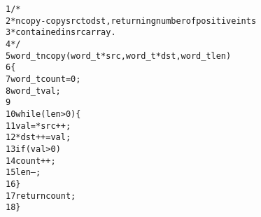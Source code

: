 \begin{alltt}
{\scriptsize   1} /*
{\scriptsize   2}  * ncopy - copy src to dst, returning number of positive ints
{\scriptsize   3}  * contained in src array.
{\scriptsize   4}  */
{\scriptsize   5} word_t ncopy(word_t *src, word_t *dst, word_t len)
{\scriptsize   6} \verb:{:
{\scriptsize   7}     word_t count = 0;
{\scriptsize   8}     word_t val;
{\scriptsize   9} 
{\scriptsize  10}     while (len > 0) \verb:{:
{\scriptsize  11}         val = *src++;
{\scriptsize  12}         *dst++ = val;
{\scriptsize  13}         if (val > 0)
{\scriptsize  14}             count++;
{\scriptsize  15}         len--;
{\scriptsize  16}     \verb:}:
{\scriptsize  17}     return count;
{\scriptsize  18} \verb:}:
\end{alltt}
